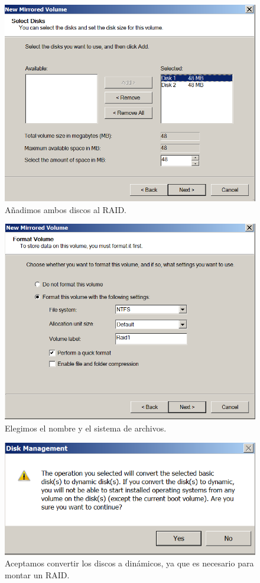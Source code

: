 \begin{figure}[H]
\centering
\includegraphics[scale=0.5]{raid4}
\caption{Añadimos ambos discos al RAID.}
\end{figure}
\begin{figure}[H]
\centering
\includegraphics[scale=0.5]{raid5}
\caption{Elegimos el nombre y el sistema de archivos.}
\end{figure}
\begin{figure}[H]
\centering
\includegraphics[scale=0.5]{raid6}
\caption{Aceptamos convertir los discos a dinámicos, ya que es necesario para montar un RAID.}
\end{figure}
